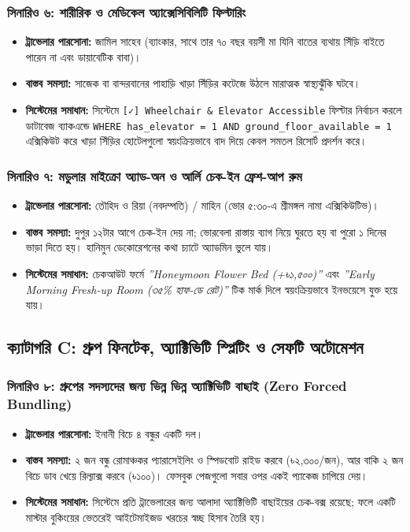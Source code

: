 \documentclass[11pt,a4paper]{article}
\begin{document}
\subsubsection{সিনারিও ৬: শারীরিক ও মেডিকেল অ্যাক্সেসিবিলিটি ফিল্টারিং}
\begin{itemize}[leftmargin=*]
    \item \textbf{ট্রাভেলার পারসোনা:} জামিল সাহেব (ব্যাংকার, সাথে তার ৭০ বছর বয়সী মা যিনি বাতের ব্যথায় সিঁড়ি বাইতে পারেন না এবং ডায়াবেটিক বাবা)।
    \item \textbf{বাস্তব সমস্যা:} সাজেক বা বান্দরবানের পাহাড়ি খাড়া সিঁড়ির কটেজে উঠলে মারাত্মক স্বাস্থ্যঝুঁকি ঘটবে।
    \item \textbf{সিস্টেমের সমাধান:} সিস্টেমে \texttt{[✓] Wheelchair \& Elevator Accessible} ফিল্টার নির্বাচন করলে ডাটাবেজ ব্যাকএন্ডে \texttt{WHERE has\_elevator = 1 AND ground\_floor\_available = 1} এক্সিকিউট করে খাড়া সিঁড়ির হোটেলগুলো স্বয়ংক্রিয়ভাবে বাদ দিয়ে কেবল সমতল রিসোর্ট প্রদর্শন করে।
\end{itemize}

\subsubsection{সিনারিও ৭: মডুলার মাইক্রো অ্যাড-অন ও আর্লি চেক-ইন ফ্রেশ-আপ রুম}
\begin{itemize}[leftmargin=*]
    \item \textbf{ট্রাভেলার পারসোনা:} তৌহিদ ও রিয়া (নবদম্পতি) / মাহিন (ভোর ৫:৩০-এ শ্রীমঙ্গল নামা এক্সিকিউটিভ)।
    \item \textbf{বাস্তব সমস্যা:} দুপুর ১২টার আগে চেক-ইন দেয় না; ভোরবেলা রাস্তায় ব্যাগ নিয়ে ঘুরতে হয় বা পুরো ১ দিনের ভাড়া দিতে হয়। হানিমুন ডেকোরেশনের কথা চ্যাটে অ্যাডমিন ভুলে যায়।
    \item \textbf{সিস্টেমের সমাধান:} চেকআউট ফর্মে \textit{''Honeymoon Flower Bed (+৳১,৫০০)''} এবং \textit{''Early Morning Fresh-up Room (৩৫\% হাফ-ডে রেট)''} টিক মার্ক দিলে স্বয়ংক্রিয়ভাবে ইনভয়েসে যুক্ত হয়ে যায়।
\end{itemize}

\subsection{ক্যাটাগরি C: গ্রুপ ফিনটেক, অ্যাক্টিভিটি স্প্লিটিং ও সেফটি অটোমেশন}

\subsubsection{সিনারিও ৮: গ্রুপের সদস্যদের জন্য ভিন্ন ভিন্ন অ্যাক্টিভিটি বাছাই (Zero Forced Bundling)}
\begin{itemize}[leftmargin=*]
    \item \textbf{ট্রাভেলার পারসোনা:} ইনানী বিচে ৪ বন্ধুর একটি দল।
    \item \textbf{বাস্তব সমস্যা:} ২ জন বন্ধু রোমাঞ্চকর প্যারাসেইলিং ও স্পিডবোট রাইড করবে (৳২,৩০০/জন), আর বাকি ২ জন বিচে ডাব খেয়ে রিল্যাক্স করবে (৳১০০)। ফেসবুক পেজগুলো সবার ওপর একই প্যাকেজ চাপিয়ে দেয়।
    \item \textbf{সিস্টেমের সমাধান:} সিস্টেমে প্রতি ট্রাভেলারের জন্য আলাদা অ্যাক্টিভিটি বাছাইয়ের চেক-বক্স রয়েছে; ফলে একটি মাস্টার বুকিংয়ের ভেতরেই আইটেমাইজড খরচের স্বচ্ছ হিসাব তৈরি হয়।
\end{itemize}
\end{document}
